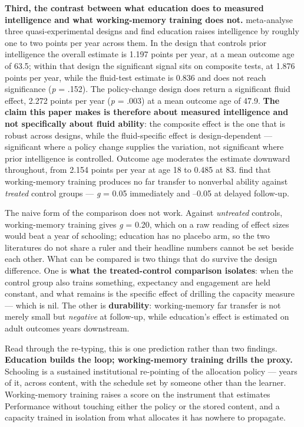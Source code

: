 \documentclass[12pt,a4paper]{article}
\begin{document}
\textbf{Third, the contrast between what education does to measured intelligence and what working-memory training does not.} \citet{RitchieTuckerDrob2018} meta-analyse three quasi-experimental designs and find education raises intelligence by roughly one to two points per year across them. In the design that controls prior intelligence the overall estimate is 1.197 points per year, at a mean outcome age of 63.5; within that design the significant signal sits on composite tests, at 1.876 points per year, while the fluid-test estimate is 0.836 and does not reach significance (\emph{p} = .152). The policy-change design does return a significant fluid effect, 2.272 points per year (\emph{p} = .003) at a mean outcome age of 47.9. \textbf{The claim this paper makes is therefore about measured intelligence and not specifically about fluid ability}: the composite effect is the one that is robust across designs, while the fluid-specific effect is design-dependent ---\hspace{0pt} significant where a policy change supplies the variation, not significant where prior intelligence is controlled. Outcome age moderates the estimate downward throughout, from 2.154 points per year at age 18 to 0.485 at 83. \citet{MelbyLervag2016} find that working-memory training produces no far transfer to nonverbal ability against \emph{treated} control groups ---\hspace{0pt} \emph{g} = 0.05 immediately and --0.05 at delayed follow-up.

The naive form of the comparison does not work. Against \emph{untreated} controls, working-memory training gives \emph{g} = 0.20, which on a raw reading of effect sizes would beat a year of schooling; education has no placebo arm, so the two literatures do not share a ruler and their headline numbers cannot be set beside each other. What can be compared is two things that do survive the design difference. One is \textbf{what the treated-control comparison isolates}: when the control group also trains something, expectancy and engagement are held constant, and what remains is the specific effect of drilling the capacity measure ---\hspace{0pt} which is nil. The other is \textbf{durability}: working-memory far transfer is not merely small but \emph{negative} at follow-up, while education's effect is estimated on adult outcomes years downstream.

Read through the re-typing, this is one prediction rather than two findings. \textbf{Education builds the loop; working-memory training drills the proxy.} Schooling is a sustained institutional re-pointing of the allocation policy ---\hspace{0pt} years of it, across content, with the schedule set by someone other than the learner. Working-memory training raises a score on the instrument that estimates Performance without touching either the policy or the stored content, and a capacity trained in isolation from what allocates it has nowhere to propagate.
\end{document}
